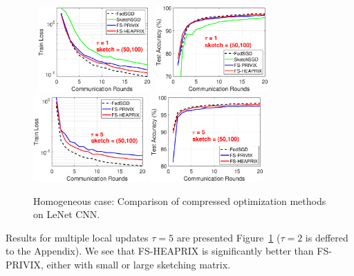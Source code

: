 \documentclass[twoside]{article}
\begin{document}
\begin{figure}[t]
\begin{center}
{		}
		\mbox{
		\includegraphics[width=1.7in]{MNIST_figures/local1_sketch50_iid1_train_loss.eps} \hspace{-0.2in}
		\includegraphics[width=1.7in]{MNIST_figures/local1_sketch50_iid1_test_acc.eps} \hspace{-0.2in}
		}
		\mbox{
		\includegraphics[width=1.7in]{MNIST_figures/local5_sketch50_iid1_train_loss.eps}\hspace{-0.2in}
		\includegraphics[width=1.7in]{MNIST_figures/local5_sketch50_iid1_test_acc.eps}\hspace{-0.2in}
		}
	\end{center}
	\caption{Homogeneous case: Comparison of compressed optimization methods on LeNet CNN.}
    \label{fig:MNIST-iid1}
\end{figure}
Results for multiple local updates $\tau=5$ are presented Figure~\ref{fig:MNIST-iid1} ($\tau=2$ is deffered to the Appendix). 
We see that FS-HEAPRIX is significantly better than FS-PRIVIX, either with small or large sketching matrix. 
\end{document}
